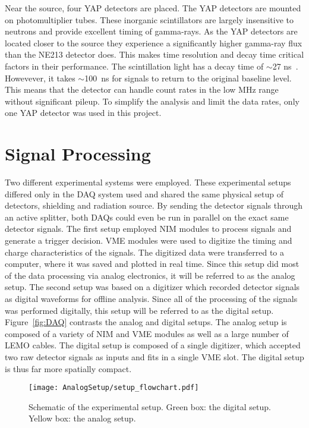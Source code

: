 \documentclass[main.tex]{subfiles}
\begin{document}
Near the source, four YAP detectors are placed. The YAP detectors are mounted on photomultiplier tubes. These inorganic scintillators are largely insensitive to neutrons and provide excellent timing of gamma-rays. As the YAP detectors are located closer to the source they experience a significantly higher gamma-ray flux than the NE213 detector does. This makes time resolution and decay time critical factors in their performance. The scintillation light has a decay time of $\sim$27 ns~\cite{Scionix}. Howevever, it takes $\sim$\SI{100}{ns} for signals to return to the original baseline level. This means that the detector can handle count rates in the low MHz range without significant pileup. To simplify the analysis and limit the data rates, only one YAP detector was used in this project.

\section{Signal Processing}
Two different experimental systems were employed. These experimental setups differed only in the DAQ system used and shared the same physical setup of detectors, shielding and radiation source. By sending the detector signals through an active splitter, both DAQs could even be run in parallel on the exact same detector signals. The first setup employed NIM modules to process signals and generate a trigger decision. VME modules were used to digitize the timing and charge characteristics of the signals. The digitized data were transferred to a computer, where it was saved and plotted in real time. Since this setup did most of the data processing via analog electronics, it will be referred to as the analog setup. The second setup was based on a digitizer which recorded detector signals as digital waveforms for offline analysis. Since all of the processing of the signals was performed digitally, this setup will be referred to as the digital setup. Figure~\ref{fig:DAQ} contrasts the analog and digital setups. The analog setup is composed of a variety of NIM and VME modules as well as a large number of LEMO cables. The digital setup is composed of a single digitizer, which accepted two raw detector signals as inputs and fits in a single VME slot. The digital setup is thus far more spatially compact.

\begin{figure}[h]
    \centering
        \texttt{[image: AnalogSetup/setup\_flowchart.pdf]}
        \caption[Schematic of the experimental setup]{Schematic of the experimental setup. Green box: the digital setup. Yellow box: the analog setup.}
    \label{fig:setup}
\end{figure}
\end{document}
